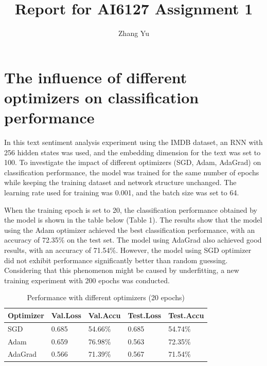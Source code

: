\documentclass[letterpaper]{article} %
\title{Report for AI6127 Assignment 1}
\author{
	Zhang Yu
}
\begin{document}
	
\maketitle 

\section{The influence of different optimizers on classification performance}

In this text sentiment analysis experiment using the IMDB dataset, an RNN with 256 hidden states was used, and the embedding dimension for the text was set to 100. To investigate the impact of different optimizers (SGD, Adam, AdaGrad) on classification performance, the model was trained for the same number of epochs while keeping the training dataset and network structure unchanged. The learning rate used for training was 0.001, and the batch size was set to 64.

When the training epoch is set to 20, the classification performance obtained by the model is shown in the table below (Table 1). The results show that the model using the Adam optimizer achieved the best classification performance, with an accuracy of 72.35\% on the test set. The model using AdaGrad also achieved good results, with an accuracy of 71.54\%. However, the model using SGD optimizer did not exhibit performance significantly better than random guessing. Considering that this phenomenon might be caused by underfitting, a new training experiment with 200 epochs was conducted.

\begin{table}[H] %
	\centering %
	\caption{Performance with different optimizers (20 epochs)} 
	\label{tab:various optimizers} 	
	\begin{tabularx}{\columnwidth}{l X X X X}
		\toprule 
		\textbf{Optimizer} & \textbf{Val.Loss} & \textbf{Val.Accu} & \textbf{Test.Loss} & \textbf{Test.Accu} \\ 
		\midrule 
		SGD & 0.685 & 54.66\% & 0.685 & 54.74\%\\
		Adam & 0.659 & 76.98\% & 0.563 & 72.35\%\\
		AdaGrad & 0.566 & 71.39\% & 0.567 & 71.54\% \\
		\bottomrule 
	\end{tabularx}
\end{table}
\end{document}
